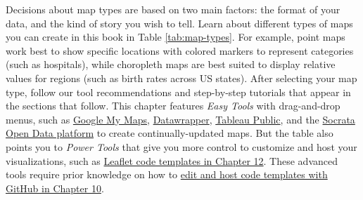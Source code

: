 \documentclass[
  english,
]{book}
\begin{document}
Decisions about map types are based on two main factors: the format of your data, and the kind of story you wish to tell. Learn about different types of maps you can create in this book in Table \ref{tab:map-types}. For example, point maps work best to show specific locations with colored markers to represent categories (such as hospitals), while choropleth maps are best suited to display relative values for regions (such as birth rates across US states). After selecting your map type, follow our tool recommendations and step-by-step tutorials that appear in the sections that follow. This chapter features \emph{Easy Tools} with drag-and-drop menus, such as \href{mymaps.html}{Google My Maps}, \href{symbolmap-datawrapper.html}{Datawrapper}, \href{map-tableau.html}{Tableau Public}, and the \href{map-socrata.html}{Socrata Open Data platform} to create continually-updated maps. But the table also points you to \emph{Power Tools} that give you more control to customize and host your visualizations, such as \href{leaflet.html}{Leaflet code templates in Chapter 12}. These advanced tools require prior knowledge on how to \href{github.html}{edit and host code templates with GitHub in Chapter 10}.
\end{document}
